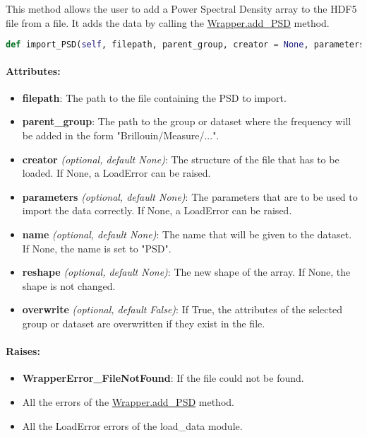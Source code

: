 This method allows the user to add a Power Spectral Density array to the HDF5 file from a file. It adds the data by calling the \hyperref[subsec:wrapper.add_psd]{Wrapper.add\_PSD} method.


\begin{lstlisting}[language=Python]
def import_PSD(self, filepath, parent_group, creator = None, parameters = None, name = None, reshape = None, overwrite = False):
\end{lstlisting}

\paragraph{Attributes:}

\begin{itemize}
    \item \textbf{filepath}: The path to the file containing the PSD to import.
    \item \textbf{parent\_group}: The path to the group or dataset where the frequency will be added in the form "Brillouin/Measure/...".
    \item \textbf{creator} \textit{(optional, default None)}: The structure of the file that has to be loaded. If None, a LoadError can be raised.
    \item \textbf{parameters} \textit{(optional, default None)}: The parameters that are to be used to import the data correctly.  If None, a LoadError can be raised.
    \item \textbf{name} \textit{(optional, default None)}: The name that will be given to the dataset. If None, the name is set to "PSD".
    \item \textbf{reshape} \textit{(optional, default None)}: The new shape of the array. If None, the shape is not changed.
    \item \textbf{overwrite} \textit{(optional, default False)}: If True, the attributes of the selected group or dataset are overwritten if they exist in the file.
\end{itemize}


\paragraph{Raises:}
\begin{itemize}
    \item \textbf{WrapperError\_FileNotFound}: If the file could not be found.
    \item All the errors of the \hyperref[subsec:wrapper.add_psd]{Wrapper.add\_PSD} method.
    \item All the LoadError errors of the load\_data module.
\end{itemize}